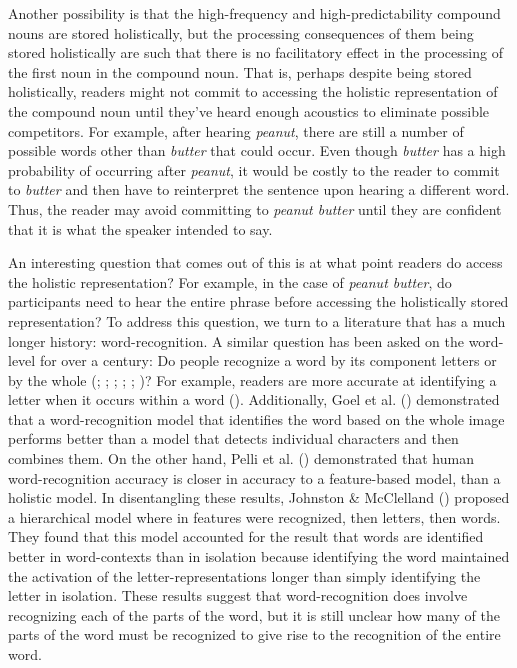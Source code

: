 \documentclass[
  12pt,
  letterpaper,
]{scrreport}
\begin{document}
Another possibility is that the high-frequency and high-predictability
compound nouns are stored holistically, but the processing consequences
of them being stored holistically are such that there is no facilitatory
effect in the processing of the first noun in the compound noun. That
is, perhaps despite being stored holistically, readers might not commit
to accessing the holistic representation of the compound noun until
they've heard enough acoustics to eliminate possible competitors. For
example, after hearing \emph{peanut}, there are still a number of
possible words other than \emph{butter} that could occur. Even though
\emph{butter} has a high probability of occurring after \emph{peanut},
it would be costly to the reader to commit to \emph{butter} and then
have to reinterpret the sentence upon hearing a different word. Thus,
the reader may avoid committing to \emph{peanut butter} until they are
confident that it is what the speaker intended to say.

An interesting question that comes out of this is at what point readers
do access the holistic representation? For example, in the case of
\emph{peanut butter}, do participants need to hear the entire phrase
before accessing the holistically stored representation? To address this
question, we turn to a literature that has a much longer history:
word-recognition. A similar question has been asked on the word-level
for over a century: Do people recognize a word by its component letters
or by the whole (; ;
;
;
;
)? For
example, readers are more accurate at identifying a letter when it
occurs within a word
(). Additionally, Goel et al.
() demonstrated that a
word-recognition model that identifies the word based on the whole image
performs better than a model that detects individual characters and then
combines them. On the other hand, Pelli et al.
() demonstrated
that human word-recognition accuracy is closer in accuracy to a
feature-based model, than a holistic model. In disentangling these
results, Johnston \& McClelland
()
proposed a hierarchical model where in features were recognized, then
letters, then words. They found that this model accounted for the result
that words are identified better in word-contexts than in isolation
because identifying the word maintained the activation of the
letter-representations longer than simply identifying the letter in
isolation. These results suggest that word-recognition does involve
recognizing each of the parts of the word, but it is still unclear how
many of the parts of the word must be recognized to give rise to the
recognition of the entire word.
\end{document}
